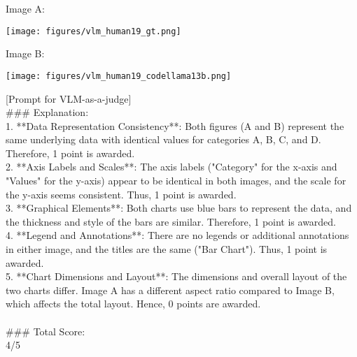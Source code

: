 \onecolumn
\begin{tcolorbox}[colback=blue!5!white, colframe=blue!75!black, title=Example \#2 of VLM-as-a-judge (Model: CodeLlama-13B-Instruct), text width=\textwidth]
Image A:\\
\begin{center}
    \texttt{[image: figures/vlm\_human19\_gt.png]}
\end{center}
Image B:\\
\begin{center}
    \texttt{[image: figures/vlm\_human19\_codellama13b.png]}
\end{center}
[Prompt for VLM-as-a-judge]\\
\#\#\# Explanation:\\
1. **Data Representation Consistency**: Both figures (A and B) represent the same underlying data with identical values for categories A, B, C, and D. Therefore, 1 point is awarded.\\
2. **Axis Labels and Scales**: The axis labels ("Category" for the x-axis and "Values" for the y-axis) appear to be identical in both images, and the scale for the y-axis seems consistent. Thus, 1 point is awarded.\\
3. **Graphical Elements**: Both charts use blue bars to represent the data, and the thickness and style of the bars are similar. Therefore, 1 point is awarded.\\
4. **Legend and Annotations**: There are no legends or additional annotations in either image, and the titles are the same ("Bar Chart"). Thus, 1 point is awarded.\\
5. **Chart Dimensions and Layout**: The dimensions and overall layout of the two charts differ. Image A has a different aspect ratio compared to Image B, which affects the total layout. Hence, 0 points are awarded.\\
\\
\#\#\# Total Score:\\
4/5
\end{tcolorbox}
\twocolumn